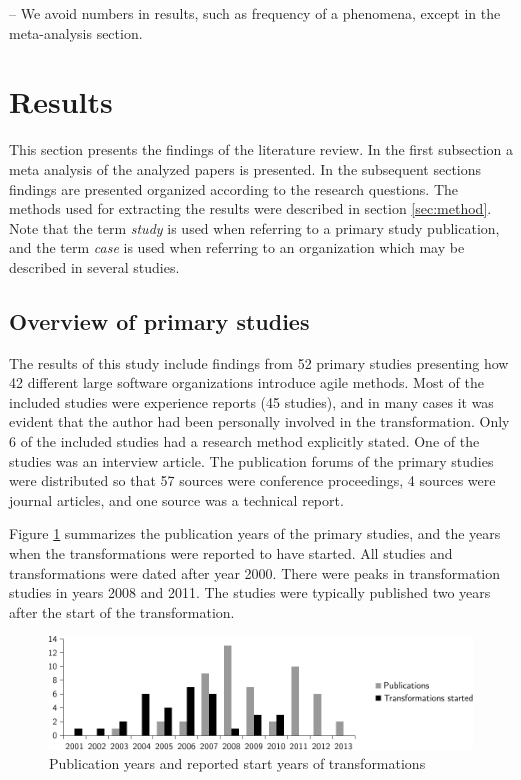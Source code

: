 \documentclass[preprint,authoryear,12pt]{elsarticle}
\begin{document}
-- We avoid numbers in results, such as frequency of a phenomena, except in the
   meta-analysis section.


\clearpage

\section{Results}
\label{sec:results}

This section presents the findings of the literature review. In the first
subsection a meta analysis of the analyzed papers is presented. In the
subsequent sections findings are presented organized according to the research
questions. The methods used for extracting the results were described in section
\ref{sec:method}. Note that the term \emph{study} is used when referring to a
primary study publication, and the term \emph{case} is used when referring to an
organization which may be described in several studies.

\subsection{Overview of primary studies}

The results of this study include findings from 52 primary studies presenting
how 42 different large software organizations introduce agile methods. Most of
the included studies were experience reports (45 studies), and in many cases it
was evident that the author had been personally involved in the transformation.
Only 6 of the included studies had a research method explicitly stated. One of
the studies was an interview article. The publication forums of the primary
studies were distributed so that 57 sources were conference proceedings, 4
sources were journal articles, and one source was a technical report.

Figure \ref{fig:transformation_time} summarizes the publication years of the
primary studies, and the years when the transformations were reported to have
started. All studies and transformations were dated after year 2000. There were
peaks in transformation studies in years 2008 and 2011. The studies were
typically published two years after the start of the transformation.

\begin{figure}[b]
  \begin{center}
    \includegraphics[width=1\textwidth]{graphics/transformation_time.pdf}
    \caption{Publication years and reported start years of transformations}
    \label{fig:transformation_time}
  \end{center}
\end{figure}
\end{document}
